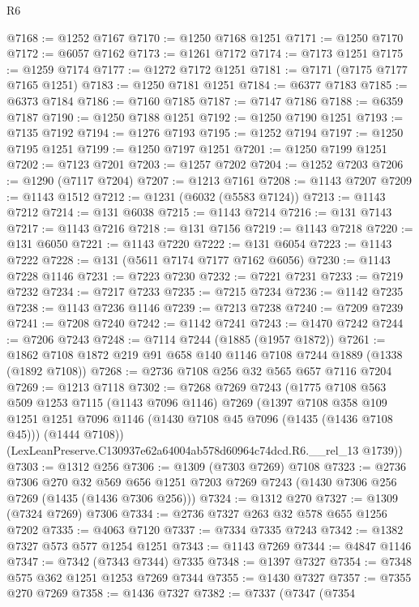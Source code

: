 \begin{lexlean}{R6}
\begin{coremodule}
@7168 := @1252 @7167
@7170 := @1250 @7168 @1251
@7171 := @1250 @7170
@7172 := @6057 @7162
@7173 := @1261 @7172
@7174 := @7173 @1251
@7175 := @1259 @7174
@7177 := @1272 @7172 @1251
@7181 := @7171 (@7175 @7177 @7165 @1251)
@7183 := @1250 @7181 @1251
@7184 := @6377 @7183
@7185 := @6373 @7184
@7186 := @7160 @7185
@7187 := @7147 @7186
@7188 := @6359 @7187
@7190 := @1250 @7188 @1251
@7192 := @1250 @7190 @1251
@7193 := @7135 @7192
@7194 := @1276 @7193
@7195 := @1252 @7194
@7197 := @1250 @7195 @1251
@7199 := @1250 @7197 @1251
@7201 := @1250 @7199 @1251
@7202 := @7123 @7201
@7203 := @1257 @7202
@7204 := @1252 @7203
@7206 := @1290 (@7117 @7204)
@7207 := @1213 @7161
@7208 := @1143 @7207
@7209 := @1143 @1512
@7212 := @1231 (@6032 (@5583 @7124))
@7213 := @1143 @7212
@7214 := @131 @6038
@7215 := @1143 @7214
@7216 := @131 @7143
@7217 := @1143 @7216
@7218 := @131 @7156
@7219 := @1143 @7218
@7220 := @131 @6050
@7221 := @1143 @7220
@7222 := @131 @6054
@7223 := @1143 @7222
@7228 := @131 (@5611 @7174 @7177 @7162 @6056)
@7230 := @1143 @7228 @1146
@7231 := @7223 @7230
@7232 := @7221 @7231
@7233 := @7219 @7232
@7234 := @7217 @7233
@7235 := @7215 @7234
@7236 := @1142 @7235
@7238 := @1143 @7236 @1146
@7239 := @7213 @7238
@7240 := @7209 @7239
@7241 := @7208 @7240
@7242 := @1142 @7241
@7243 := @1470 @7242
@7244 := @7206 @7243
@7248 := @7114 @7244 (@1885 (@1957 @1872))
@7261 := @1862 @7108 @1872 @219 @91 @658 @140 @1146 @7108 @7244 @1889 (@1338 (@1892 @7108))
@7268 := @2736 @7108 @256 @32 @565 @657 @7116 @7204
@7269 := @1213 @7118
@7302 := @7268
    @7269
    @7243
    (@1775
      @7108
      @563
      @509
      @1253
      @7115
      (@1143 @7096 @1146)
      @7269
      (@1397
        @7108
        @358
        @109
        @1251
        @1251
        @7096
        @1146
        (@1430 @7108 @45 @7096 (@1435 (@1436 @7108 @45)))
        (@1444 @7108))
      (LexLeanPreserve.C130937e62a64004ab578d60964c74dcd.R6.__rel_13 @1739))
@7303 := @1312 @256
@7306 := @1309 (@7303 @7269) @7108
@7323 := @2736
    @7306
    @270
    @32
    @569
    @656
    @1251
    @7203
    @7269
    @7243
    (@1430 @7306 @256 @7269 (@1435 (@1436 @7306 @256)))
@7324 := @1312 @270
@7327 := @1309 (@7324 @7269) @7306
@7334 := @2736 @7327 @263 @32 @578 @655 @1256 @7202
@7335 := @4063 @7120
@7337 := @7334 @7335 @7243
@7342 := @1382 @7327 @573 @577 @1254 @1251
@7343 := @1143 @7269
@7344 := @4847 @1146
@7347 := @7342 (@7343 @7344) @7335
@7348 := @1397 @7327
@7354 := @7348 @575 @362 @1251 @1253 @7269 @7344
@7355 := @1430 @7327
@7357 := @7355 @270 @7269
@7358 := @1436 @7327
@7382 := @7337
    (@7347
      (@7354

\end{coremodule}
\end{lexlean}
